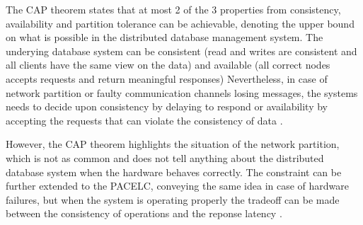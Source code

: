 The CAP theorem states that at most 2 of the 3 properties from consistency, availability and partition tolerance can be achievable, denoting the upper bound on what is possible in the distributed database management system. The underying database system can be consistent (read and writes are consistent and all clients have the same view on the data) and available (all correct nodes accepts requests and return meaningful responses) Nevertheless, in case of network partition or faulty communication channels losing messages, the systems needs to decide upon consistency by delaying to respond or availability by accepting the requests that can violate the consistency of data \cite{PerspectivesOnArchitectureEvolution}.

However, the CAP theorem highlights the situation of the network partition, which is not as common and does not tell anything about the distributed database system when the hardware behaves correctly. The constraint can be further extended to the PACELC, conveying the same idea in case of hardware failures, but when the system is operating properly the tradeoff can be made between the consistency of operations and the reponse latency \cite{NoSQLDatabaseSystemsSurveyDecisionGuidance}.





